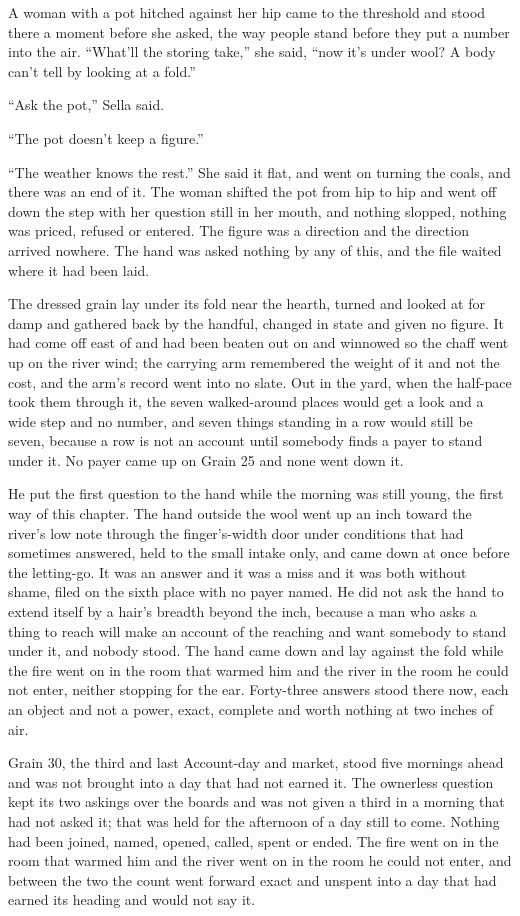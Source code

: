 A woman with a pot hitched against her hip came to the threshold and stood there a moment before she asked, the way people stand before they put a number into the air. “What'll the storing take,” she said, “now it's under wool? A body can't tell by looking at a fold.”

“Ask the pot,” Sella said.

“The pot doesn't keep a figure.”

“The weather knows the rest.” She said it flat, and went on turning the coals, and there was an end of it. The woman shifted the pot from hip to hip and went off down the step with her question still in her mouth, and nothing slopped, nothing was priced, refused or entered. The figure was a direction and the direction arrived nowhere. The hand was asked nothing by any of this, and the file waited where it had been laid.

The dressed grain lay under its fold near the hearth, turned and looked at for damp and gathered back by the handful, changed in state and given no figure. It had come off  east of  and had been beaten out on  and winnowed so the chaff went up on the river wind; the carrying arm remembered the weight of it and not the cost, and the arm's record went into no slate. Out in the yard, when the half-pace took them through it, the seven walked-around places would get a look and a wide step and no number, and seven things standing in a row would still be seven, because a row is not an account until somebody finds a payer to stand under it. No payer came up  on Grain 25 and none went down it.

He put the first question to the hand while the morning was still young, the first way of this chapter. The hand outside the wool went up an inch toward the river's low note through the finger's-width door under conditions that had sometimes answered, held to the small intake only, and came down at once before the letting-go. It was an answer and it was a miss and it was both without shame, filed on the sixth place with no payer named. He did not ask the hand to extend itself by a hair's breadth beyond the inch, because a man who asks a thing to reach will make an account of the reaching and want somebody to stand under it, and nobody stood. The hand came down and lay against the fold while the fire went on in the room that warmed him and the river in the room he could not enter, neither stopping for the ear. Forty-three answers stood there now, each an object and not a power, exact, complete and worth nothing at two inches of air.

Grain 30, the third and last Account-day and market, stood five mornings ahead and was not brought into a day that had not earned it. The ownerless question kept its two askings over the boards and was not given a third in a morning that had not asked it; that was held for the afternoon of a day still to come. Nothing had been joined, named, opened, called, spent or ended. The fire went on in the room that warmed him and the river went on in the room he could not enter, and between the two the count went forward exact and unspent into a day that had earned its heading and would not say it.
